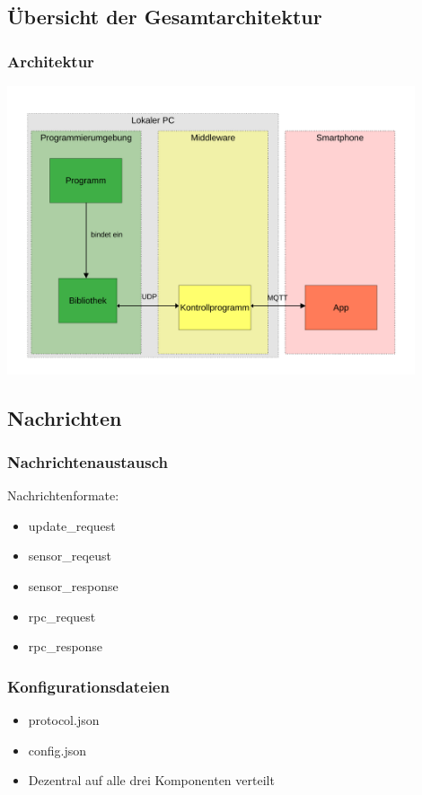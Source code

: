 \documentclass{beamer}
\begin{document}
\subsection{Übersicht der Gesamtarchitektur}
\begin{frame}
    \frametitle[]{Architektur}
    \centering
    \includegraphics[width=0.9\textwidth]{images/framework.pdf}
\end{frame}

\subsection*{Nachrichten}
\begin{frame}
    \frametitle[]{Nachrichtenaustausch}
    Nachrichtenformate:
        \begin{itemize}
            \item update\_request
            \item sensor\_reqeust
            \item sensor\_response
            \item rpc\_request
            \item rpc\_response
        \end{itemize}
        
\end{frame}

\begin{frame}
\frametitle[]{Konfigurationsdateien}
\begin{itemize}
    \item protocol.json
    \item config.json
    \item Dezentral auf alle drei Komponenten verteilt
\end{itemize}
\end{frame}
\end{document}
